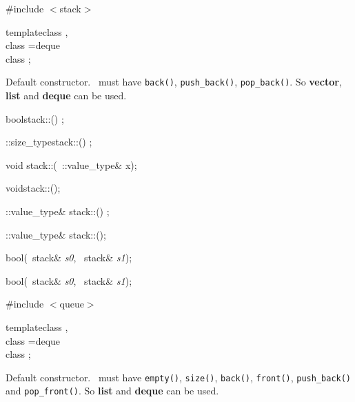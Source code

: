 \begin{multicols}{4}
\#include $<$stack$>$

\begin{templdec}
template\<class \T,\\
\phantom{template$<$}class \Container=deque\TPT\ \>\\
class ;\\
\end{templdec}

Default constructor. \Container\ must have
\texttt{back()}, 
\texttt{push_back()}, 
\texttt{pop_back()}.
So 
\textbf{vector},
\textbf{list} and
\textbf{deque}
can be used.

bool\enskip stack::() \const;

\Container::size_type\enskip stack::() \const;

void\newline
stack::(\const\ \Container::value_type\& x);

void\enskip stack::();

\const \Container::value_type\&\newline
stack::() \const;

\Container::value_type\& stack::();

{}

bool\enskip \opereq(\const\  stack\& \textsl{s0},
\phantom{bool\enskip \opereq\lp}\const\  stack\& \textsl{s1});

bool\enskip \operlt(\const\  stack\& \textsl{s0},
\phantom{bool\enskip \operlt\lp}\const\  stack\& \textsl{s1});


\#include $<$queue$>$\newline

\begin{templdec}
template\<class \T,\\
\phantom{template$<$}class \Container=deque\TPT\ \>\\
class ;\\
\end{templdec}

Default constructor. \Container\ must
 have
\texttt{empty()}, 
\texttt{size()}, 
\texttt{back()}, 
\texttt{front()}, 
\texttt{push_back()} and
{\small\texttt{pop_front()}}.
So 
\textbf{list} and
\textbf{deque}
can be used.


\end{multicols}
